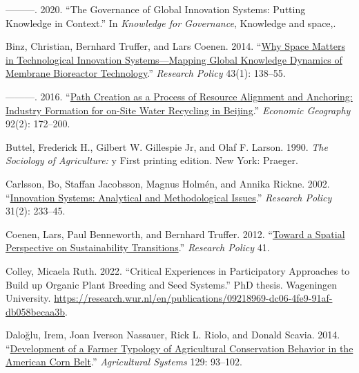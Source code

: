 \documentclass[twoside,12pt,final]{ucthesis-CA2012}
\newlength{\cslhangindent}
\newenvironment{CSLReferences}[2] %
 {%
  \setlength{\parindent}{0pt}
  \ifodd #1 \everypar{\setlength{\hangindent}{\cslhangindent}}\ignorespaces\fi
  \ifnum #2 > 0
  \setlength{\parskip}{#2\baselineskip}
  \fi
 }%
 {}
\begin{document}
\begin{ucmainmatter}
\begin{CSLReferences}{1}{0}
\leavevmode{}%
---------. 2020. {``The Governance of Global Innovation Systems: Putting Knowledge in Context.''} In \emph{Knowledge for Governance}, Knowledge and space,.

\leavevmode{}%
Binz, Christian, Bernhard Truffer, and Lars Coenen. 2014. {``\href{https://doi.org/10.1016/j.respol.2013.07.002}{Why Space Matters in Technological Innovation Systems---Mapping Global Knowledge Dynamics of Membrane Bioreactor Technology}.''} \emph{Research Policy} 43(1): 138--55.

\leavevmode{}%
---------. 2016. {``\href{https://doi.org/10.1080/00130095.2015.1103177}{Path Creation as a Process of Resource Alignment and Anchoring: Industry Formation for on-Site Water Recycling in Beijing}.''} \emph{Economic Geography} 92(2): 172--200.

\leavevmode{}%
Buttel, Frederick H., Gilbert W. Gillespie Jr, and Olaf F. Larson. 1990. \emph{The Sociology of Agriculture:} y First printing edition. New York: Praeger.

\leavevmode{}%
Carlsson, Bo, Staffan Jacobsson, Magnus Holmén, and Annika Rickne. 2002. {``\href{https://doi.org/10.1016/S0048-7333(01)00138-X}{Innovation Systems: Analytical and Methodological Issues}.''} \emph{Research Policy} 31(2): 233--45.

\leavevmode{}%
Coenen, Lars, Paul Benneworth, and Bernhard Truffer. 2012. {``\href{https://doi.org/10.1016/j.respol.2012.02.014}{Toward a Spatial Perspective on Sustainability Transitions}.''} \emph{Research Policy} 41.

\leavevmode{}%
Colley, Micaela Ruth. 2022. {``Critical Experiences in Participatory Approaches to Build up Organic Plant Breeding and Seed Systems.''} PhD thesis. Wageningen University. \url{https://research.wur.nl/en/publications/09218969-dc06-4fe9-91af-db058becaa3b}.

\leavevmode{}%
Daloğlu, Irem, Joan Iverson Nassauer, Rick L. Riolo, and Donald Scavia. 2014. {``\href{https://doi.org/10.1016/j.agsy.2014.05.007}{Development of a Farmer Typology of Agricultural Conservation Behavior in the American Corn Belt}.''} \emph{Agricultural Systems} 129: 93--102.


\end{CSLReferences}
\end{ucmainmatter}
\end{document}
